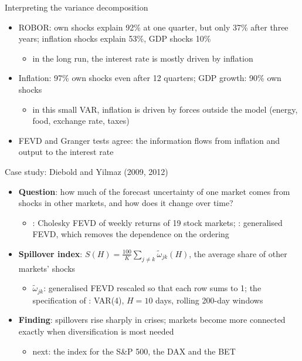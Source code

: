 \begin{frame}{Interpreting the variance decomposition}
\itemsize{\small}
\begin{itemize}
    \item ROBOR: own shocks explain 92\% at one quarter, but only 37\% after three years; inflation shocks explain 53\%, GDP shocks 10\%
    \begin{itemize}
        \item in the long run, the interest rate is mostly driven by inflation
    \end{itemize}
    \item Inflation: 97\% own shocks even after 12 quarters; GDP growth: 90\% own shocks
    \begin{itemize}
        \item in this small VAR, inflation is driven by forces outside the model (energy, food, exchange rate, taxes)
    \end{itemize}
    \item FEVD and Granger tests agree: the information flows from inflation and output to the interest rate
\end{itemize}
\end{frame}

\begin{frame}{Case study: Diebold and Yilmaz (2009, 2012)}
\itemsize{\small}
\begin{itemize}
    \item \textbf{Question}: how much of the forecast uncertainty of one market comes from shocks in other markets, and how does it change over time?
    \begin{itemize}
        \item {}: Cholesky FEVD of weekly returns of 19 stock markets; : generalised FEVD, which removes the dependence on the ordering
    \end{itemize}
    \item \textbf{Spillover index}: $S(H) = \frac{100}{K}\sum_{j \ne k}\tilde\omega_{jk}(H)$, the average share of other markets' shocks
    \begin{itemize}
        \item $\tilde\omega_{jk}$: generalised FEVD rescaled so that each row sums to 1; the specification of : VAR(4), $H = 10$ days, rolling 200-day windows
    \end{itemize}
    \item \textbf{Finding}: spillovers rise sharply in crises; markets become more connected exactly when diversification is most needed
    \begin{itemize}
        \item next: the index for the S\&P 500, the DAX and the BET
    \end{itemize}
\end{itemize}
\end{frame}

